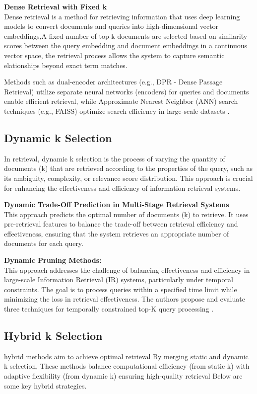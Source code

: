 \textbf{Dense Retrieval with Fixed k} \\
Dense retrieval \cite{karpukhin2020dense} is a method for retrieving information that uses deep learning models to convert documents and queries into high-dimensional vector embeddings,A fixed number of top-k documents are selected based on similarity scores between the query embedding and document embeddings in a continuous vector space, the retrieval process allows the system to capture semantic elationships beyond exact term matches.

Methods such as dual-encoder architectures (e.g., DPR - Dense Passage Retrieval)\cite{chen-etal-2024-dense} utilize separate neural networks (encoders) for queries and documents enable efficient retrieval, while Approximate Nearest Neighbor (ANN) search techniques (e.g., FAISS)\cite{enwiki:1276232158} optimize search efficiency in large-scale datasets .
\subsection{Dynamic k Selection}
In retrieval, dynamic k selection is the process of varying the quantity of documents (k) that are retrieved according to the properties of the query, such as its ambiguity, complexity, or relevance score distribution. This approach is crucial for enhancing the effectiveness and efficiency of information retrieval systems.

\textbf{Dynamic Trade-Off Prediction in Multi-Stage Retrieval Systems }\\ This approach predicts the optimal number of documents (k) to retrieve. It uses pre-retrieval features to balance the trade-off between retrieval efficiency and effectiveness, ensuring that the system retrieves an appropriate number of documents for each query\cite{culpepper2016dynamictradeoffpredictionmultistage}.

\textbf{Dynamic Pruning Methods:}\\
This approach addresses the challenge of balancing effectiveness and efficiency in large-scale Information Retrieval (IR) systems, particularly under temporal constraints. The goal is to process queries within a specified time limit while minimizing the loss in retrieval effectiveness. The authors propose and evaluate three techniques for temporally constrained top-K query processing \cite{10.1007/978-3-319-70145-5_1}.
\subsection{Hybrid k Selection}
hybrid methods aim to achieve optimal retrieval By merging static and dynamic k selection, These methods balance computational efficiency (from static k) with adaptive flexibility (from dynamic k) ensuring high-quality retrieval Below are some key hybrid strategies.


